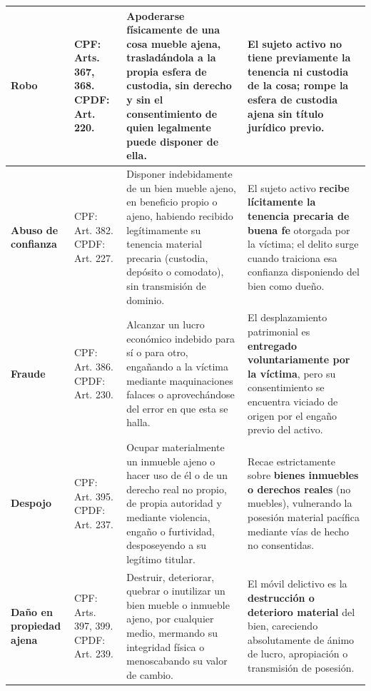 \documentclass[spanish,letterpaper,oneside]{article}
\begin{document}
\begin{longtable}{@{}L{2.1cm} L{2.6cm} L{5.8cm} L{4.3cm}@{}}
\textbf{Robo} & 
CPF: Arts. 367, 368.\newline
CPDF: Art. 220. & 
Apoderarse f\'isicamente de una cosa mueble ajena, traslad\'andola a la propia esfera de custodia, sin derecho y sin el consentimiento de quien legalmente puede disponer de ella. & 
El sujeto activo \textbf{no tiene previamente la tenencia ni custodia} de la cosa; rompe la esfera de custodia ajena sin t\'itulo jur\'idico previo. \\
\midrule
{}
\textbf{Abuso de confianza} & 
CPF: Art. 382.\newline
CPDF: Art. 227. & 
Disponer indebidamente de un bien mueble ajeno, en beneficio propio o ajeno, habiendo recibido leg\'itimamente su tenencia material precaria (custodia, dep\'osito o comodato), sin transmisi\'on de dominio. & 
El sujeto activo \textbf{recibe l\'icitamente la tenencia precaria de buena fe} otorgada por la v\'ictima; el delito surge cuando traiciona esa confianza disponiendo del bien como due\~no. \\
\midrule
\textbf{Fraude} & 
CPF: Art. 386.\newline
CPDF: Art. 230. & 
Alcanzar un lucro econ\'omico indebido para s\'i o para otro, enga\~nando a la v\'ictima mediante maquinaciones falaces o aprovech\'andose del error en que esta se halla. & 
El desplazamiento patrimonial es \textbf{entregado voluntariamente por la v\'ictima}, pero su consentimiento se encuentra viciado de origen por el enga\~no previo del activo. \\
\midrule
{}
\textbf{Despojo} & 
CPF: Art. 395.\newline
CPDF: Art. 237. & 
Ocupar materialmente un inmueble ajeno o hacer uso de \'el o de un derecho real no propio, de propia autoridad y mediante violencia, enga\~no o furtividad, desposeyendo a su leg\'itimo titular. & 
Recae estrictamente sobre \textbf{bienes inmuebles o derechos reales} (no muebles), vulnerando la posesi\'on material pac\'ifica mediante v\'ias de hecho no consentidas. \\
\midrule
\textbf{Da\~no en propiedad ajena} & 
CPF: Arts. 397, 399.\newline
CPDF: Art. 239. & 
Destruir, deteriorar, quebrar o inutilizar un bien mueble o inmueble ajeno, por cualquier medio, mermando su integridad f\'isica o menoscabando su valor de cambio. & 
El m\'ovil delictivo es la \textbf{destrucci\'on o deterioro material} del bien, careciendo absolutamente de \'animo de lucro, apropiaci\'on o transmisi\'on de posesi\'on. \\
\bottomrule
\end{longtable}
\endgroup
\end{document}
